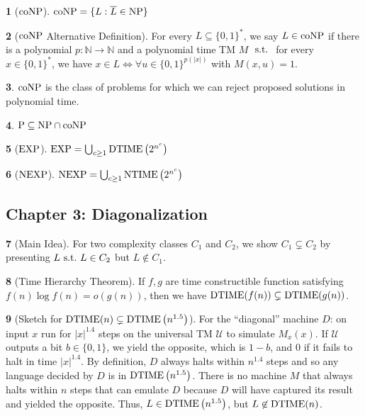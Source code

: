 \documentclass[10pt]{article}
\theoremstyle{definition}
\newtheorem{note}{}[section]
\begin{document}
\begin{note}[$\mathrm{coNP}$]
  $\mathrm{coNP} = \{L : \overline{L} \in \mathrm{NP}\}$
\end{note}

\begin{note}[$\mathrm{coNP}$ Alternative Definition]
  For every $L \subseteq \{0, 1\}^\ast$, we say $L \in \mathrm{coNP}$ if there
  is a polynomial $p : \mathbb{N} \to \mathbb{N}$ and a polynomial time
  TM $M$ $\mathrm{\ s.t.\ }$ for every $x \in \{0, 1\}^\ast$, we have
  $x \in L \iff \forall u \in \{0, 1\}^{p(|x|)}$ with $M(x, u) = 1$.
\end{note}

\begin{note}
  $\mathrm{coNP}$ is the class of problems for which we can reject proposed solutions
  in polynomial time.
\end{note}

\begin{note}
  $\mathrm{P} \subseteq \mathrm{NP} \cap \mathrm{coNP}$
\end{note}

\begin{note}[$\mathrm{EXP}$]
  $\mathrm{EXP} = \bigcup_{c \geq 1} \mathrm{DTIME}\left(2^{n^c}\right)$
\end{note}

\begin{note}[$\mathrm{NEXP}$]
  $\mathrm{NEXP} = \bigcup_{c \geq 1} \mathrm{NTIME}\left(2^{n^c}\right)$
\end{note}


\subsection*{Chapter 3: Diagonalization}
\begin{note}[Main Idea]
  For two complexity classes $C_1$ and $C_2$, we show
  $C_1 \subsetneq C_2$ by presenting $L \mathrm{\ s.t.\ } L \in C_2$ but $L \not\in C_1$.
\end{note}

\begin{note}[Time Hierarchy Theorem]
  If $f, g$ are time constructible function satisfying
  $f(n) \log f(n) = o (g(n))$, then we have
  $\mathrm{DTIME}(f(n)) \subsetneq \mathrm{DTIME}(g(n))$.
\end{note}

\begin{note}[Sketch for $\mathrm{DTIME}(n) \subsetneq \mathrm{DTIME}\left(n^{1.5}\right)$]
  For the ``diagonal'' machine $D$:
  on input $x$ run for $|x|^{1.4}$ steps on the universal TM $\mathcal{U}$
  to simulate $M_x (x)$.
  If $\mathcal{U}$ outputs a bit $b \in \{0, 1\}$, we yield the opposite,
  which is $1 - b$, and $0$ if it fails to halt in time $|x|^{1.4}$.
  By definition, $D$ always halts within $n^{1.4}$ steps and so any language
  decided by $D$ is in $\mathrm{DTIME}\left(n^{1.5}\right)$.
  There is no machine $M$ that always halts within $n$ steps that can emulate
  $D$ because $D$ will have captured its result and yielded the opposite.
  Thus, $L \in \mathrm{DTIME}\left(n^{1.5}\right)$, but $L \not\in \mathrm{DTIME}(n)$.
\end{note}
\end{document}
